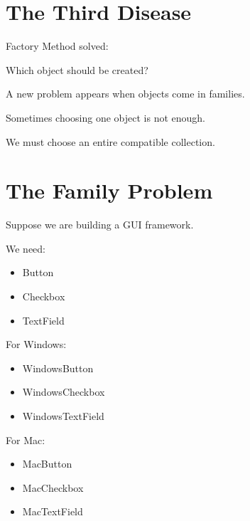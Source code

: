 \documentclass[11pt,a4paper]{book}
\begin{document}
\section{The Third Disease}

\begin{idea}

Factory Method solved:

\begin{center}
Which object should be created?
\end{center}

A new problem appears when objects come in
families.

\end{idea}

Sometimes choosing one object is not enough.

We must choose an entire compatible collection.


\section{The Family Problem}

Suppose we are building a GUI framework.

We need:

\begin{itemize}

\item Button
\item Checkbox
\item TextField

\end{itemize}

For Windows:

\begin{itemize}

\item WindowsButton
\item WindowsCheckbox
\item WindowsTextField

\end{itemize}

For Mac:

\begin{itemize}

\item MacButton
\item MacCheckbox
\item MacTextField

\end{itemize}
\end{document}

